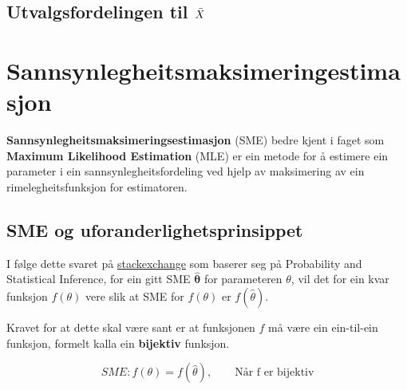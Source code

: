 \subsection{Utvalgsfordelingen til \texorpdfstring{$\Bar{X}$}{Utvalgsjennomsnittet}}


\section{Sannsynlegheitsmaksimeringestimasjon}
\textbf{Sannsynlegheitsmaksimeringsestimasjon} (SME) bedre kjent i faget som \textbf{Maximum Likelihood Estimation} (MLE) er ein metode for å estimere ein parameter i ein sannsynlegheitsfordeling ved hjelp av maksimering av ein rimelegheitsfunksjon for estimatoren.

\subsection{SME og uforanderlighetsprinsippet}
I følge dette svaret på \href{https://stats.stackexchange.com/questions/77573/invariance-property-of-mle-what-is-the-mle-of-theta2-of-normal-barx2}{stackexchange} som baserer seg på Probability and Statistical Inference\cite{mukhopadhyay2020probability}, for ein gitt SME $\boldsymbol{\hat{\theta}}$ for parameteren $\theta$, vil det for ein kvar funksjon $f(\theta)$ vere slik at SME for $f(\theta)$ er $f(\hat{\theta})$.

Kravet for at dette skal være sant er at funksjonen $f$ må være ein ein-til-ein funksjon, formelt kalla ein \textbf{bijektiv} funksjon.

\begin{equation}
    SME: f(\theta) = f(\hat{\theta}), \qquad \text{Når f er bijektiv}
\end{equation}